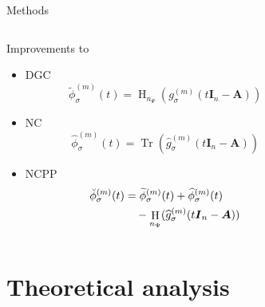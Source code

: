 \documentclass[aspectratio=169, leqno, 12pt]{beamer}
\newcommand{\mtx}[1]{\boldsymbol{#1}}
\DeclareMathOperator{\Tr}{Tr}
\DeclareMathOperator{\Hutch}{H}
\begin{document}
\begin{frame}{Methods}
    \begin{columns}
        \begin{column}{0.55\textwidth}
            Improvements to \cite{lin2017randomized}
            \begin{itemize}
                \item \gls{DGC}
                \begin{equation}
                    \widetilde{\phi}_{\sigma}^{(m)}(t) = \Hutch_{n_{\Psi}}(g_{\sigma}^{(m)}(t\mtx{I}_n - \mtx{A}))
                \end{equation}
                \item \gls{NC}
                \begin{equation}
                    \widehat{\phi}_{\sigma}^{(m)}(t) = \Tr(\widehat{g}_{\sigma}^{(m)}(t\mtx{I}_n - \mtx{A}))
                \end{equation}
                \item \gls{NCPP}
                \begin{align}
                    \breve{\phi}_{\sigma}^{(m)}(t) &= \widetilde{\phi}_{\sigma}^{(m)}(t) + \widehat{\phi}_{\sigma}^{(m)}(t) \notag \\
                    &\hspace{10pt}- \Hutch_{n_{\Psi}}(\widehat{g}_{\sigma}^{(m)}(t\mtx{I}_n - \mtx{A}))
                \end{align}
            \end{itemize}
        \end{column}
        \begin{column}{0.45\textwidth}
            \scalebox{0.7}{}
        \end{column}
    \end{columns}
\end{frame}

\section{Theoretical analysis}
\end{document}
